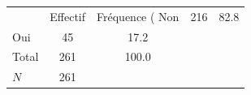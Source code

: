 {
\def\sym#1{\ifmmode^{#1}\else\(^{#1}\)\fi}
\begin{tabular}{l*{1}{cc}}
\toprule
            &    Effectif&Fréquence (%
\midrule
Non         &         216&        82.8\\
Oui         &          45&        17.2\\
Total       &         261&       100.0\\
\midrule
\(N\)       &         261&            \\
\bottomrule
\end{tabular}
}
